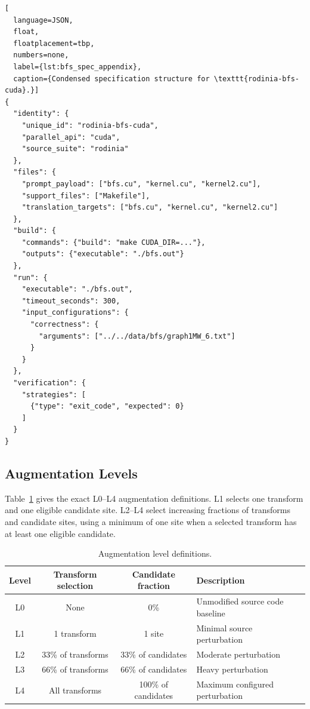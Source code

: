 \begin{lstlisting}[
  language=JSON,
  float,
  floatplacement=tbp,
  numbers=none,
  label={lst:bfs_spec_appendix},
  caption={Condensed specification structure for \texttt{rodinia-bfs-cuda}.}]
{
  "identity": {
    "unique_id": "rodinia-bfs-cuda",
    "parallel_api": "cuda",
    "source_suite": "rodinia"
  },
  "files": {
    "prompt_payload": ["bfs.cu", "kernel.cu", "kernel2.cu"],
    "support_files": ["Makefile"],
    "translation_targets": ["bfs.cu", "kernel.cu", "kernel2.cu"]
  },
  "build": {
    "commands": {"build": "make CUDA_DIR=..."},
    "outputs": {"executable": "./bfs.out"}
  },
  "run": {
    "executable": "./bfs.out",
    "timeout_seconds": 300,
    "input_configurations": {
      "correctness": {
        "arguments": ["../../data/bfs/graph1MW_6.txt"]
      }
    }
  },
  "verification": {
    "strategies": [
      {"type": "exit_code", "expected": 0}
    ]
  }
}
\end{lstlisting}

\subsection{Augmentation Levels}
\label{sec:appendix-framework-augmentation}

Table~\ref{tab:augmentation-levels} gives the exact L0--L4 augmentation
definitions. L1 selects one transform and one eligible candidate site. L2--L4
select increasing fractions of transforms and candidate sites, using a minimum
of one site when a selected transform has at least one eligible candidate.

\begin{table}[htbp]
\centering
\caption{Augmentation level definitions.}
\label{tab:augmentation-levels}
\small
\begin{tabular}{@{}cccp{4.2cm}@{}}
\toprule
Level & Transform selection & Candidate fraction & Description \\
\midrule
L0 & None & 0\% & Unmodified source code baseline \\
L1 & 1 transform & 1 site & Minimal source perturbation \\
L2 & 33\% of transforms & 33\% of candidates & Moderate perturbation \\
L3 & 66\% of transforms & 66\% of candidates & Heavy perturbation \\
L4 & All transforms & 100\% of candidates & Maximum configured perturbation \\
\bottomrule
\end{tabular}
\end{table}

